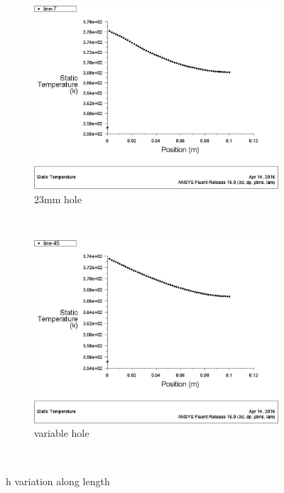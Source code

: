 \begin{figure}[h]
 	\begin{subfigure}[b]{0.5\textwidth}
 		\includegraphics[width=\textwidth]{131.jpg}
 		\caption{23mm hole}
 		\label{fig:structured}
 	\end{subfigure}%
 	~ %
 	\begin{subfigure}[b]{0.5\textwidth}
 		\includegraphics[width=\textwidth]{132.jpg}
 		\caption{variable hole}
 		\label{fig:unstructured}
 	\end{subfigure}

 	~ %
 	\caption{h variation along length }\label{fig:Meshing}
 \end{figure}
 


